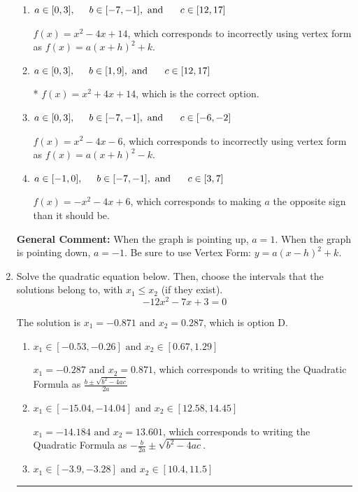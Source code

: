 \documentclass{extbook}[14pt]
\newcommand{\litem}[1]{\item #1

\rule{\textwidth}{0.4pt}}
\begin{document}
\begin{enumerate}
{\begin{enumerate}[label=\Alph*.]
$f(x)=-x^{2} +4 x + 6$, which corresponds to incorrectly using vertex form as $f(x) = a(x+h)^2+k$ AND making $a$ the opposite sign than it should be.
\item \( a \in [0, 3], \hspace*{5mm} b \in [-7, -1], \text{ and } \hspace*{5mm} c \in [12, 17] \)

$f(x)=x^{2} -4 x + 14$, which corresponds to incorrectly using vertex form as $f(x) = a(x+h)^2+k$.
\item \( a \in [0, 3], \hspace*{5mm} b \in [1, 9], \text{ and } \hspace*{5mm} c \in [12, 17] \)

* $f(x)=x^{2} +4 x + 14$, which is the correct option.
\item \( a \in [0, 3], \hspace*{5mm} b \in [-7, -1], \text{ and } \hspace*{5mm} c \in [-6, -2] \)

$f(x)=x^{2} -4 x -6$, which corresponds to incorrectly using vertex form as $f(x) = a(x+h)^2 - k$.
\item \( a \in [-1, 0], \hspace*{5mm} b \in [-7, -1], \text{ and } \hspace*{5mm} c \in [3, 7] \)

$f(x)=-x^{2} -4 x + 6$, which corresponds to making $a$ the opposite sign than it should be.
\end{enumerate}

\textbf{General Comment:} When the graph is pointing up, $a=1$. When the graph is pointing down, $a=-1$. Be sure to use Vertex Form: $y = a(x-h)^2+k$.
}
\litem{
Solve the quadratic equation below. Then, choose the intervals that the solutions belong to, with $x_1 \leq x_2$ (if they exist).
\[ -12x^{2} -7 x + 3 = 0 \]

The solution is \( x_1 = -0.871 \text{ and } x_2 = 0.287 \), which is option D.\begin{enumerate}[label=\Alph*.]
\item \( x_1 \in [-0.53, -0.26] \text{ and } x_2 \in [0.67, 1.29] \)

 $x_1 = -0.287 \text{ and } x_2 = 0.871$, which corresponds to writing the Quadratic Formula as $\frac{b \pm \sqrt{b^2 - 4ac}}{2a}$
\item \( x_1 \in [-15.04, -14.04] \text{ and } x_2 \in [12.58, 14.45] \)

 $x_1 = -14.184 \text{ and } x_2 = 13.601$, which corresponds to writing the Quadratic Formula as $-\frac{b}{2a} \pm \sqrt{b^2 - 4ac}$.
\item \( x_1 \in [-3.9, -3.28] \text{ and } x_2 \in [10.4, 11.5] \)


\end{enumerate}}
\end{enumerate}
\end{document}
